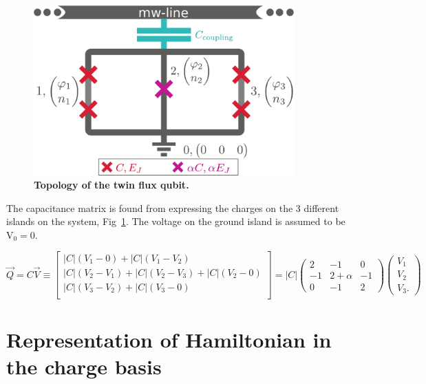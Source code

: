 \documentclass[%
superscriptaddress,
preprint,
preprintnumbers,
bibnotes,
amsmath,
amssymb,
aps,
showkeys,
prb,
]{revtex4-2}
\newcommand{\iabs}[1]{\ensuremath{\left|#1\right|}}
\begin{document}
\begin{figure}[ht]
  \centering
  \includegraphics[width=100mm]{fig1_supp}
  \caption{\textbf{Topology of the twin flux qubit.}\label{fig:supp1}}
\end{figure}

The capacitance matrix is found from expressing the charges on the 3 different islands on the system, Fig~\ref{fig:supp1}. The voltage on the ground island is assumed to be V$_{0} = $0.
  
  \begin{equation}
    \label{eq:4jjlinear_1}
    \vec{Q} = C\vec{V} \equiv \begin{bmatrix}
      \left|C\right|\left(V_1-0\right) + \left|C\right|\left(V_1-V_2\right) \\
      \left|C\right|\left(V_2-V_1\right) + \left|C\right|\left(V_2-V_3\right)+ \left|C\right|\left(V_2-0\right) \\
      \left|C\right|\left(V_3-V_2\right) + \left|C\right|\left(V_3-0\right) \\
    \end{bmatrix} = \iabs{C} \begin{pmatrix}
      2 & -1 & 0\\
      -1 & 2 + \alpha & -1\\
      0 & -1 & 2
    \end{pmatrix}\begin{pmatrix}
      V_{1}\\V_2\\V_{3}.
    \end{pmatrix}
  \end{equation}

\section{Representation of Hamiltonian in the charge basis}
\label{sec:repr-hamilt-charge}
\end{document}
